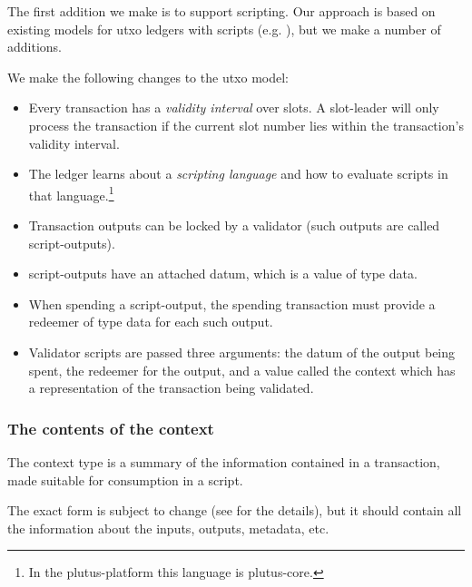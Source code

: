 
The first addition we make is to support scripting.
Our approach is based on existing models for \gls{utxo} ledgers with scripts (e.g. \textcite{Zahnentferner18-UTxO}), but we make a number of additions.

We make the following changes to the \gls{utxo} model:

\begin{itemize}
\item
  Every transaction has a \emph{validity interval} over slots.
  A \gls{slot-leader} will only process the transaction if the current slot number lies within the transaction's validity interval.

\item
  The ledger learns about a \emph{scripting language} and how to evaluate scripts in that language.\footnote{
    In the \gls{plutus-platform} this language is \gls{plutus-core}.
    }

\item
  Transaction outputs can be locked by a \gls{validator} (such outputs are called \glspl{script-output}).

\item
  \Glspl{script-output} have an attached \gls{datum}, which is a value of type \gls{data}.

\item
  When spending a \gls{script-output}, the spending transaction must provide a \gls{redeemer} of type \gls{data} for each such output.

\item
  Validator scripts are passed three arguments: the \gls{datum} of the output being spent, the \gls{redeemer} for the output, and a value called the \gls{context} which has a representation of the transaction being validated.
\end{itemize}


\subsubsection{The contents of the context}
The \gls{context} type is a summary of the information contained in a transaction, made suitable for consumption in a \gls{script}.

The exact form is subject to change (see \textcite{eutxo} for the details), but it should contain all the information about the inputs, outputs, metadata, etc.

